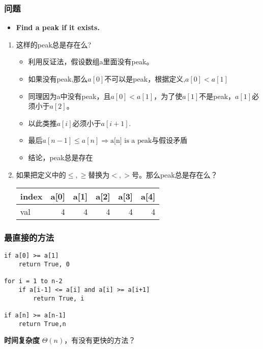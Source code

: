 \documentclass[11pt]{article}
\begin{document}
\begin{CJK}{UTF8}{gbsn}
\subsubsection{问题}

\begin{itemize}
\item \textbf{Find a peak if it exists.}
\end{itemize}

\begin{enumerate}
\item 这样的peak总是存在么?
  \begin{itemize}
  \item 利用反证法，假设数组a里面没有peak。
  \item 如果没有peak,那么$a[0]$不可以是peak，根据定义,$a[0]<a[1]$
  \item 同理因为a中没有peak，且$a[0]<a[1]$，为了使$a[1]$不是peak，$a[1]$必须小于$a[2]$。
  \item 以此类推$a[i]$必须小于$a[i+1]$.
  \item 最后$a[n-1]\leqslant a[n] \Rightarrow \mbox{a[n] is a peak}$与假设矛盾
  \item 结论，peak总是存在
  \end{itemize}
\item 如果把定义中的$\leqslant ,\geqslant $替换为$<,>$号。那么peak总是存在么？

  \begin{center}
    \begin{tabular}{|l|r|r|r|r|r|}
      \hline
      index & a[0] & a[1] & a[2] & a[3] & a[4]\\
      \hline
      val & 4 & 4 & 4 & 4 & 4\\
      \hline
    \end{tabular}
  \end{center}
\end{enumerate}

\subsubsection{最直接的方法}

\begin{verbatim}
if a[0] >= a[1] 
    return True, 0

for i = 1 to n-2
    if a[i-1] <= a[i] and a[i] >= a[i+1]
        return True, i

if a[n] >= a[n-1]
    return True,n
\end{verbatim}
\textbf{时间复杂度} $\Theta(n)$，有没有更快的方法？


\end{CJK}
\end{document}
